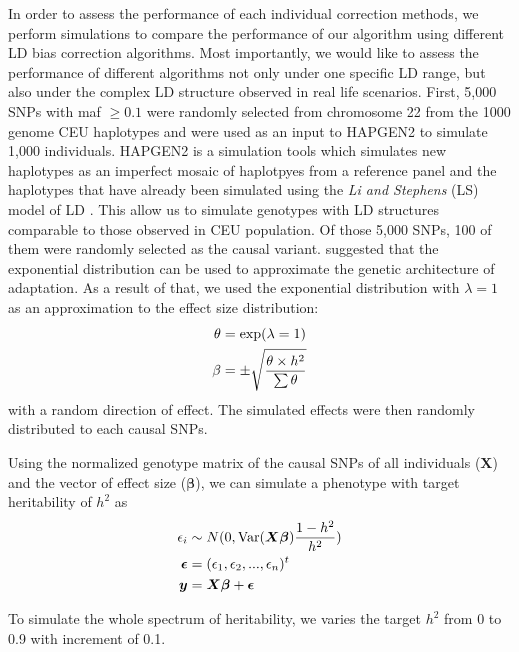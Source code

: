 		In order to assess the performance of each individual correction methods, we perform simulations to compare the performance of our algorithm using different \gls{LD} bias correction algorithms.
		Most importantly, we would like to assess the performance of different algorithms not only under one specific \gls{LD} range, but also under the complex \gls{LD} structure observed in real life scenarios.
		First, 5,000 \glspl{SNP} with \gls{maf} $\ge0.1$ were randomly selected from chromosome 22 from the 1000 genome \gls{CEU} haplotypes and were used as an input to HAPGEN2 \citep{Su2011} to simulate 1,000 individuals.
		HAPGEN2 is a simulation tools which simulates new haplotypes as an imperfect mosaic of haplotpyes from a reference panel and the haplotypes that have already been simulated using the \textit{Li and Stephens} (LS) model of \gls{LD} \citep{Li2003}.
		This allow us to simulate genotypes with \gls{LD} structures comparable to those observed in \gls{CEU} population. 
		Of those 5,000 \glspl{SNP}, 100 of them were randomly selected as the causal variant. 
		\citet{Orr1998} suggested that the exponential distribution can be used to approximate the genetic architecture of adaptation. 
		As a result of that, we used the exponential distribution with $\lambda=1$ as an approximation to the effect size distribution:
		\begin{align}
		\theta&=\mathrm{exp}(\lambda=1)\notag\\
		\beta&=\pm\sqrt{\frac{\theta \times h^2}{\sum \theta}}
		\label{eq:randomEffect}
		\end{align}
		with a random direction of effect.
		The simulated effects were then randomly distributed to each causal \glspl{SNP}.
			
		Using the normalized genotype matrix of the causal \glspl{SNP} of all individuals ($\boldsymbol{X}$) and the vector of effect size ($\boldsymbol{\beta}$), we can simulate a phenotype with target heritability of $h^2$ as
		\begin{align}
		\epsilon_i&\sim N(0,\mathrm{Var}(\boldsymbol{X\beta})\frac{1-h^2}{h^2} )\notag\\
		\boldsymbol{\epsilon} &= (\epsilon_1,\epsilon_2,...,\epsilon_n)^t\notag\\
		\boldsymbol{y} &= \boldsymbol{X\beta}+\boldsymbol{\epsilon}
		\label{eq:simulationOfPhenotype}
		\end{align}
		
		To simulate the whole spectrum of heritability, we varies the target $h^2$ from 0 to 0.9 with increment of 0.1.
		
